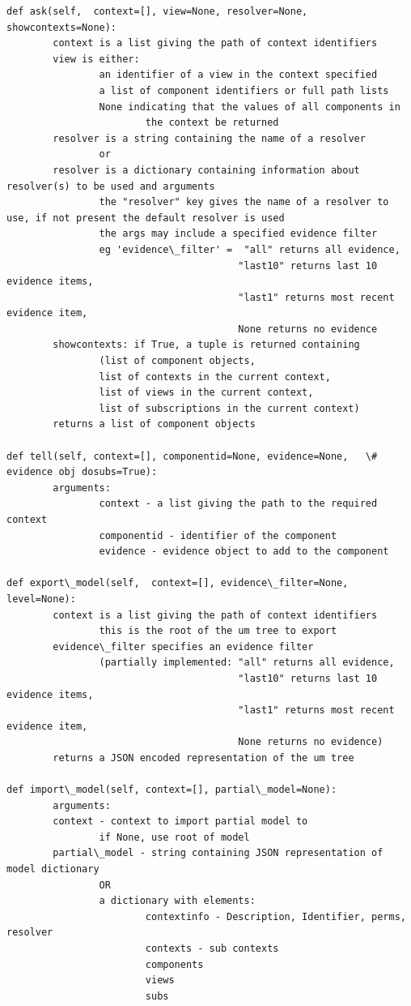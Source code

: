 \documentclass[a4paper,10pt,english]{sphinxmanual}
\begin{document}
\begin{Verbatim}[commandchars=\\\{\}]
def ask(self,  context=[], view=None, resolver=None, showcontexts=None):
        context is a list giving the path of context identifiers
        view is either:
                an identifier of a view in the context specified
                a list of component identifiers or full path lists
                None indicating that the values of all components in
                        the context be returned
        resolver is a string containing the name of a resolver
                or
        resolver is a dictionary containing information about resolver(s) to be used and arguments
                the "resolver" key gives the name of a resolver to use, if not present the default resolver is used
                the args may include a specified evidence filter
                eg 'evidence\_filter' =  "all" returns all evidence,
                                        "last10" returns last 10 evidence items,
                                        "last1" returns most recent evidence item,
                                        None returns no evidence
        showcontexts: if True, a tuple is returned containing
                (list of component objects,
                list of contexts in the current context,
                list of views in the current context,
                list of subscriptions in the current context)
        returns a list of component objects

def tell(self, context=[], componentid=None, evidence=None,   \# evidence obj dosubs=True):
        arguments:
                context - a list giving the path to the required context
                componentid - identifier of the component
                evidence - evidence object to add to the component

def export\_model(self,  context=[], evidence\_filter=None, level=None):
        context is a list giving the path of context identifiers
                this is the root of the um tree to export
        evidence\_filter specifies an evidence filter
                (partially implemented: "all" returns all evidence,
                                        "last10" returns last 10 evidence items,
                                        "last1" returns most recent evidence item,
                                        None returns no evidence)
        returns a JSON encoded representation of the um tree

def import\_model(self, context=[], partial\_model=None):
        arguments:
        context - context to import partial model to
                if None, use root of model
        partial\_model - string containing JSON representation of model dictionary
                OR
                a dictionary with elements:
                        contextinfo - Description, Identifier, perms, resolver
                        contexts - sub contexts
                        components
                        views
                        subs


\end{Verbatim}
\end{document}
